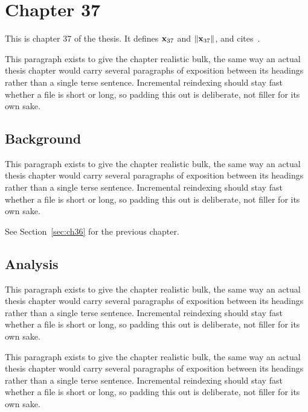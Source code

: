 \section{Chapter 37}
\label{sec:ch37}

This is chapter 37 of the thesis. It defines $\mathbf{x}_{37}$ and $\lVert \mathbf{x}_{37} \rVert$, and cites~\cite{ref1}.

This paragraph exists to give the chapter realistic bulk, the same way an actual thesis chapter would carry several paragraphs of exposition between its headings rather than a single terse sentence. Incremental reindexing should stay fast whether a file is short or long, so padding this out is deliberate, not filler for its own sake.

\subsection{Background}
\label{sec:ch37:background}

This paragraph exists to give the chapter realistic bulk, the same way an actual thesis chapter would carry several paragraphs of exposition between its headings rather than a single terse sentence. Incremental reindexing should stay fast whether a file is short or long, so padding this out is deliberate, not filler for its own sake.

See Section~\ref{sec:ch36} for the previous chapter.

\subsection{Analysis}
\label{sec:ch37:analysis}

This paragraph exists to give the chapter realistic bulk, the same way an actual thesis chapter would carry several paragraphs of exposition between its headings rather than a single terse sentence. Incremental reindexing should stay fast whether a file is short or long, so padding this out is deliberate, not filler for its own sake.

This paragraph exists to give the chapter realistic bulk, the same way an actual thesis chapter would carry several paragraphs of exposition between its headings rather than a single terse sentence. Incremental reindexing should stay fast whether a file is short or long, so padding this out is deliberate, not filler for its own sake.
